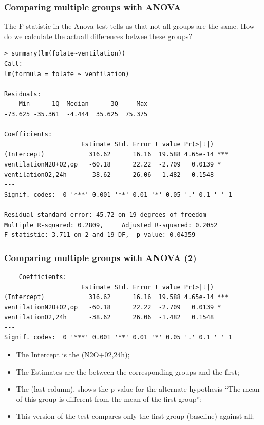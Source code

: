 \documentclass[10pt]{beamer}
\begin{document}
\begin{frame}
  \frametitle{Comparing multiple groups with ANOVA} 
{\smaller
  The F statistic in the Anova test tells us that not all groups are
  the same. How do we calculate the actuall differences betwee these
  groups?

  \begin{block}{}
\begin{verbatim}
> summary(lm(folate~ventilation))
Call:
lm(formula = folate ~ ventilation)

Residuals:
    Min      1Q  Median      3Q     Max 
-73.625 -35.361  -4.444  35.625  75.375 

Coefficients:
                     Estimate Std. Error t value Pr(>|t|)    
(Intercept)            316.62      16.16  19.588 4.65e-14 ***
ventilationN2O+O2,op   -60.18      22.22  -2.709   0.0139 *  
ventilationO2,24h      -38.62      26.06  -1.482   0.1548    
---
Signif. codes:  0 '***' 0.001 '**' 0.01 '*' 0.05 '.' 0.1 ' ' 1 

Residual standard error: 45.72 on 19 degrees of freedom
Multiple R-squared: 0.2809,     Adjusted R-squared: 0.2052 
F-statistic: 3.711 on 2 and 19 DF,  p-value: 0.04359
\end{verbatim}
  \end{block}}
\end{frame}

\begin{frame}
  \frametitle{Comparing multiple groups with ANOVA (2)}
  \begin{block}{}
\begin{verbatim}
    Coefficients:
                     Estimate Std. Error t value Pr(>|t|)    
(Intercept)            316.62      16.16  19.588 4.65e-14 ***
ventilationN2O+O2,op   -60.18      22.22  -2.709   0.0139 *  
ventilationO2,24h      -38.62      26.06  -1.482   0.1548    
---
Signif. codes:  0 '***' 0.001 '**' 0.01 '*' 0.05 '.' 0.1 ' ' 1
\end{verbatim}
  \end{block}
  \begin{itemize}
  \item The Intercept is the  (N2O+02,24h);
  \item The Estimates are the  between the
    corresponding groups and the first;
  \item The  (last column), shows the
    p-value for the alternate hypothesis ``The mean of this group is
    different from the mean of the first group'';
  \item This version of the test compares only the first group (baseline) against all;
  \end{itemize}
\end{frame}
\end{document}
